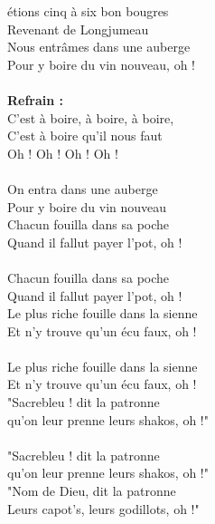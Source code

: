 
 étions cinq à six bon bougres
\\Revenant de Longjumeau
\\Nous entrâmes dans une auberge
\\Pour y boire du vin nouveau, oh !
\\\\\textbf{Refrain :}
\\C'est à boire, à boire, à boire,
\\C'est à boire qu'il nous faut
\\Oh ! Oh ! Oh ! Oh !
\\\\On entra dans une auberge
\\Pour y boire du vin nouveau
\\Chacun fouilla dans sa poche
\\Quand il fallut payer l'pot, oh !
\\\\Chacun fouilla dans sa poche
\\Quand il fallut payer l'pot, oh !
\\Le plus riche fouille dans la sienne
\\Et n'y trouve qu'un écu faux, oh !
\\\\Le plus riche fouille dans la sienne
\\Et n'y trouve qu'un écu faux, oh !
\\"Sacrebleu ! dit la patronne
\\qu'on leur prenne leurs shakos, oh !"
\\\\"Sacrebleu ! dit la patronne
\\qu'on leur prenne leurs shakos, oh !"
\\"Nom de Dieu, dit la patronne
\\Leurs capot's, leurs godillots, oh !"

